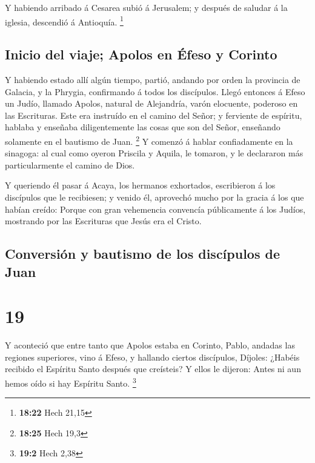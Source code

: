  Y habiendo arribado á Cesarea subió á Jerusalem; y después
de saludar á la iglesia, descendió á Antioquía. \footnote{\textbf{18:22}
  Hech 21,15}

\hypertarget{inicio-del-viaje-apolos-en-uxe9feso-y-corinto}{%
\subsection{Inicio del viaje; Apolos en Éfeso y
Corinto}\label{inicio-del-viaje-apolos-en-uxe9feso-y-corinto}}

 Y habiendo estado allí algún tiempo, partió, andando por
orden la provincia de Galacia, y la Phrygia, confirmando á todos los
discípulos.  Llegó entonces á Efeso un Judío, llamado
Apolos, natural de Alejandría, varón elocuente, poderoso en las
Escrituras.  Este era instruído en el camino del Señor; y
ferviente de espíritu, hablaba y enseñaba diligentemente las cosas que
son del Señor, enseñando solamente en el bautismo de Juan. \footnote{\textbf{18:25}
  Hech 19,3}  Y comenzó á hablar confiadamente en la
sinagoga: al cual como oyeron Priscila y Aquila, le tomaron, y le
declararon más particularmente el camino de Dios.

 Y queriendo él pasar á Acaya, los hermanos exhortados,
escribieron á los discípulos que le recibiesen; y venido él, aprovechó
mucho por la gracia á los que habían creído:  Porque con
gran vehemencia convencía públicamente á los Judíos, mostrando por las
Escrituras que Jesús era el Cristo.

\hypertarget{conversiuxf3n-y-bautismo-de-los-discuxedpulos-de-juan}{%
\subsection{Conversión y bautismo de los discípulos de
Juan}\label{conversiuxf3n-y-bautismo-de-los-discuxedpulos-de-juan}}

\hypertarget{section-18}{%
\section{19}\label{section-18}}

 Y aconteció que entre tanto que Apolos estaba en Corinto,
Pablo, andadas las regiones superiores, vino á Efeso, y hallando ciertos
discípulos,  Díjoles: ¿Habéis recibido el Espíritu Santo
después que creísteis? Y ellos le dijeron: Antes ni aun hemos oído si
hay Espíritu Santo. \footnote{\textbf{19:2} Hech 2,38}

